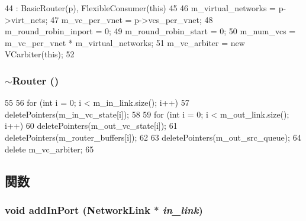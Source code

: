 \begin{DoxyCode}
44     : BasicRouter(p), FlexibleConsumer(this)
45 {
46     m_virtual_networks = p->virt_nets;
47     m_vc_per_vnet = p->vcs_per_vnet;
48     m_round_robin_inport = 0;
49     m_round_robin_start = 0;
50     m_num_vcs = m_vc_per_vnet * m_virtual_networks;
51     m_vc_arbiter = new VCarbiter(this);
52 }
\end{DoxyCode}
\hypertarget{classRouter_ae646b52cde146755b62e42fbcf59a309}{
\subsubsection[{$\sim$Router}]{\setlength{\rightskip}{0pt plus 5cm}$\sim${\bf Router} ()}}
\label{classRouter_ae646b52cde146755b62e42fbcf59a309}



\begin{DoxyCode}
55 {
56     for (int i = 0; i < m_in_link.size(); i++) {
57         deletePointers(m_in_vc_state[i]);
58     }
59     for (int i = 0; i < m_out_link.size(); i++) {
60         deletePointers(m_out_vc_state[i]);
61         deletePointers(m_router_buffers[i]);
62     }
63     deletePointers(m_out_src_queue);
64     delete m_vc_arbiter;
65 }
\end{DoxyCode}


\subsection{関数}
\hypertarget{classRouter_a861b99bda673a31b1b48132ed9369f28}{
\subsubsection[{addInPort}]{\setlength{\rightskip}{0pt plus 5cm}void addInPort ({\bf NetworkLink} $\ast$ {\em in\_\-link})}}
\label{classRouter_a861b99bda673a31b1b48132ed9369f28}



